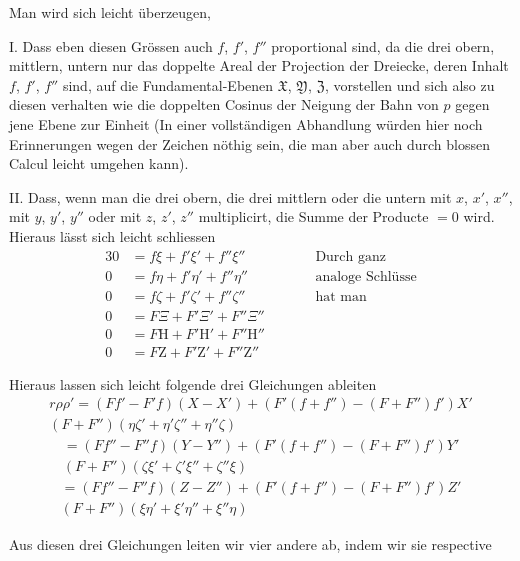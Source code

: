 \documentclass[10pt,a4paper]{article}
\newcommand{\Eta}{\mathrm{H}} %
\newcommand{\Zeta}{\mathrm{Z}} %
\begin{document}
Man wird sich leicht überzeugen,

I. Dass eben diesen Grössen auch $f$, $f'$, $f''$ proportional sind, da die drei obern, mittlern, untern nur das doppelte Areal der Projection der Dreiecke, deren Inhalt $f$, $f'$, $f''$ sind, auf die Fundamental-Ebenen $\mathfrak{X}$, $\mathfrak{Y}$, $\mathfrak{Z}$, vorstellen und sich also zu diesen verhalten wie die doppelten Cosinus der Neigung der Bahn von $p$ gegen jene Ebene zur Einheit (In einer vollständigen Abhandlung würden hier noch Erinnerungen wegen der Zeichen nöthig sein, die man aber auch durch blossen Calcul leicht umgehen kann).

II. Dass, wenn man die drei obern, die drei mittlern oder die untern mit $x$, $x'$, $x''$, mit $y$, $y'$, $y''$ oder mit $z$, $z'$, $z''$ multiplicirt, die Summe der Producte $= 0$ wird. Hieraus lässt sich leicht schliessen
\begin{alignat*}{3}
0 &= f\xi + f'\xi' + f''\xi'' & \qquad & \text{Durch ganz} \\
0 &= f\eta + f'\eta' + f''\eta'' & \qquad & \text{analoge Schlüsse} \\
0 &= f\zeta + f'\zeta' + f''\zeta'' & \qquad & \text{hat man} \\
0 &= F\Xi + F'\Xi' + F''\Xi'' & & \\
0 &= F\Eta + F'\Eta' + F''\Eta'' & & \\
0 &= F\Zeta + F'\Zeta' + F''\Zeta'' & &
\end{alignat*}

\clearpage
\noindent
Hieraus lassen sich leicht folgende drei Gleichungen ableiten
\begin{multline*}
r\rho\rho' = (Ff' - F'f)(X - X') + (F'(f + f'') - (F + F'')f')X'\\
(F + F'')(\eta\zeta' + \eta'\zeta'' + \eta''\zeta)
\end{multline*}
\begin{multline*}
= (Ff'' - F''f)(Y - Y'') + (F'(f + f'') - (F + F'')f')Y'\\
(F + F'')(\zeta\xi' + \zeta'\xi'' + \zeta''\xi)
\end{multline*}
\begin{multline*}
= (Ff'' - F''f)(Z - Z'') + (F'(f + f'') - (F + F'')f')Z'\\
(F + F'')(\xi\eta' + \xi'\eta'' + \xi''\eta)
\end{multline*}

Aus diesen drei Gleichungen leiten wir vier andere ab, indem wir sie respective
\end{document}
